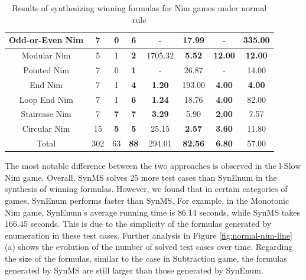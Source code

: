 \documentclass[review]{elsarticle}
\begin{document}
\begin{table}[h]
\begin{tabular}{|c|c|c|c|c|c|c|c|}
        Odd-or-Even Nim & 7 & 0 & \textbf{6} & - & 17.99 & - & 335.00 \\ \hline
        Modular Nim & 5 & 1 & \textbf{2} & 1705.32 & \textbf{5.52} & \textbf{12.00} & \textbf{12.00} \\\hline
        Pointed Nim & 7 & 0 & \textbf{1} & - & 26.87 & - & 14.00 \\ \hline
        End Nim & 7 & 1 & \textbf{4} & \textbf{1.20} & 193.00 & \textbf{4.00} & \textbf{4.00} \\  \hline
        Loop End Nim & 7 & 1 & \textbf{6} & \textbf{1.24} & 18.76 & \textbf{4.00} & 82.00 \\ \hline
        Staircase Nim & 7 & \textbf{7} & \textbf{7} & \textbf{3.29} & 5.90 & \textbf{2.00} & 7.57 \\ \hline
        Circular Nim & 15 & \textbf{5} & \textbf{5} & 25.15 & \textbf{2.57} & \textbf{3.60} & 11.80 \\ \hline
        Total & 302 & 63 & \textbf{88} & 294.01 & \textbf{82.56} & \textbf{6.80} & 57.00 \\ \hline
	\end{tabular}
	\caption{Results of synthesizing winning formulas for Nim games under normal rule}
	\label{tab:normal-nim-winFormulas}
\end{table}
The most notable difference between the two approaches is observed in the l-Slow Nim game. 
Overall, SynMS solves $25$ more test cases than SynEnum in the synthesis of winning formulas. 
However, we found that in certain categories of games, SynEnum performs faster than SynMS. For example, in the Monotonic Nim game, SynEnum's average running time is $86.14$ seconds, while SynMS takes $166.45$ seconds. This is due to the simplicity of the formulas generated by enumeration in these test cases.
Further analysis in Figure \ref{fig:normal-nim-line}(a) shows the evolution of the number of solved test cases over time. Regarding the size of the formulas, similar to the case in Subtraction game, the formulas generated by SynMS are still larger than those generated by SynEnum.
\end{document}
